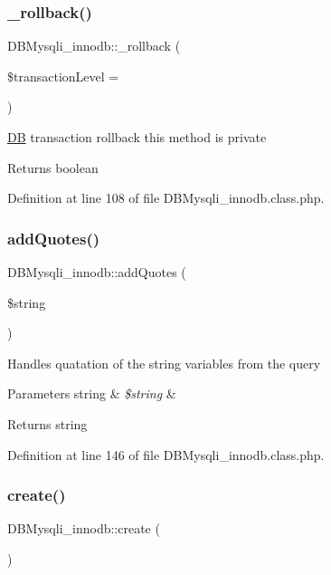 \subsubsection{\texorpdfstring{\+\_\+rollback()}{\_rollback()}}
{\footnotesize\ttfamily D\+B\+Mysqli\+\_\+innodb\+::\+\_\+rollback (\begin{DoxyParamCaption}\item[{}]{\$transaction\+Level = {} }\end{DoxyParamCaption})}

\hyperlink{classDB}{DB} transaction rollback this method is private \begin{DoxyReturn}{Returns}
boolean 
\end{DoxyReturn}


Definition at line 108 of file D\+B\+Mysqli\+\_\+innodb.\+class.\+php.

\mbox{\label{classDBMysqli__innodb_aaf7572b62d23465db5d7bba8930004fc}} 
\subsubsection{\texorpdfstring{add\+Quotes()}{addQuotes()}}
{\footnotesize\ttfamily D\+B\+Mysqli\+\_\+innodb\+::add\+Quotes (\begin{DoxyParamCaption}\item[{}]{\$string }\end{DoxyParamCaption})}

Handles quatation of the string variables from the query 
\begin{DoxyParams}[1]{Parameters}
string & {\em \$string} & \\
\hline
\end{DoxyParams}
\begin{DoxyReturn}{Returns}
string 
\end{DoxyReturn}


Definition at line 146 of file D\+B\+Mysqli\+\_\+innodb.\+class.\+php.

\mbox{\label{classDBMysqli__innodb_a70756f753a255650d67931f06d675608}} 
\subsubsection{\texorpdfstring{create()}{create()}}
{\footnotesize\ttfamily D\+B\+Mysqli\+\_\+innodb\+::create (\begin{DoxyParamCaption}{ }\end{DoxyParamCaption})}

